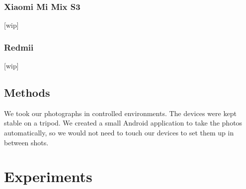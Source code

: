 \subsection{Xiaomi Mi Mix S3}
[wip]

\subsection{Redmii}
[wip]

\section{Methods}
We took our photographs in controlled environments.
The devices were kept stable on a tripod.
We created a small Android application to take the photos automatically, so we would not need to touch our devices to set them up in between shots.


\chapter{Experiments}

\section{}


